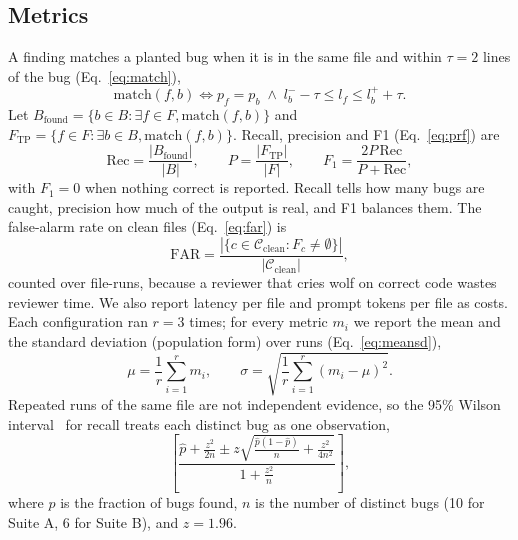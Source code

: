 \documentclass[12pt,onecolumn,draftclsnofoot]{IEEEtran}
\begin{document}
\subsection{Metrics}
A finding matches a planted bug when it is in the same file and within $\tau=2$ lines of the bug (Eq.~\ref{eq:match}),
\begin{equation}
\mathrm{match}(f,b)\iff p_f=p_b\;\wedge\;l_b^{-}-\tau\le l_f\le l_b^{+}+\tau.\label{eq:match}
\end{equation}
Let $B_{\mathrm{found}}=\{b\in B:\exists f\in F,\mathrm{match}(f,b)\}$ and $F_{\mathrm{TP}}=\{f\in F:\exists b\in B,\mathrm{match}(f,b)\}$. Recall, precision and F1 (Eq.~\ref{eq:prf}) are
\begin{equation}
\mathrm{Rec}=\frac{|B_{\mathrm{found}}|}{|B|},\qquad P=\frac{|F_{\mathrm{TP}}|}{|F|},\qquad F_1=\frac{2P\,\mathrm{Rec}}{P+\mathrm{Rec}},\label{eq:prf}
\end{equation}
with $F_1=0$ when nothing correct is reported. Recall tells how many bugs are caught, precision how much of the output is real, and F1 balances them. The false-alarm rate on clean files (Eq.~\ref{eq:far}) is
\begin{equation}
\mathrm{FAR}=\frac{|\{c\in\mathcal{C}_{\mathrm{clean}}:F_c\neq\emptyset\}|}{|\mathcal{C}_{\mathrm{clean}}|},\label{eq:far}
\end{equation}
counted over file-runs, because a reviewer that cries wolf on correct code wastes reviewer time. We also report latency per file and prompt tokens per file as costs. Each configuration ran $r=3$ times; for every metric $m_i$ we report the mean and the standard deviation (population form) over runs (Eq.~\ref{eq:meansd}),
\begin{equation}
\mu=\frac{1}{r}\sum_{i=1}^{r}m_i,\qquad \sigma=\sqrt{\frac{1}{r}\sum_{i=1}^{r}(m_i-\mu)^2}.\label{eq:meansd}
\end{equation}
Repeated runs of the same file are not independent evidence, so the 95\% Wilson interval~\cite{wilson1927probable,brown2001interval} for recall treats each distinct bug as one observation,
\begin{equation}
\left[\frac{\hat p+\frac{z^2}{2n}\pm z\sqrt{\frac{\hat p(1-\hat p)}{n}+\frac{z^2}{4n^2}}}{1+\frac{z^2}{n}}\right],\label{eq:wilson}
\end{equation}
where $\hat p$ is the fraction of bugs found, $n$ is the number of distinct bugs (10 for Suite A, 6 for Suite B), and $z=1.96$.
\end{document}
